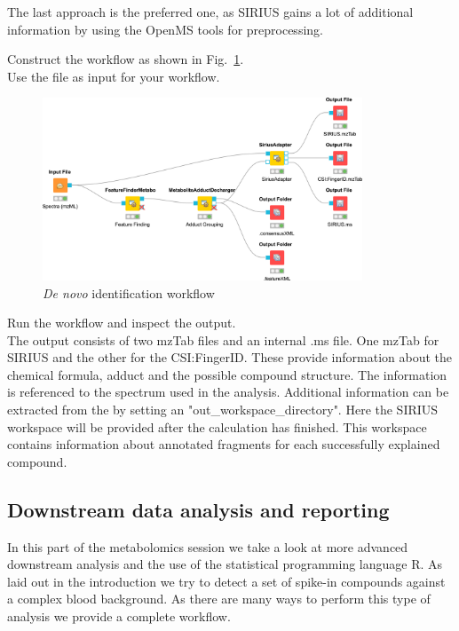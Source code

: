 The last approach is the preferred one, as SIRIUS gains a lot of additional information by using the OpenMS tools for preprocessing. 

\begin{task}
Construct the workflow as shown in Fig.~\ref{fig:denovoid}. \\
Use the file  as input for your workflow.  
\end{task}

\begin{figure}[htbp]
  \centering
  \includegraphics[width=0.85\textwidth]{graphics/metabo/denovoid.png}
  \caption{\protect\textit{De novo} identification workflow}
  \label{fig:denovoid}
\end{figure}

Run the workflow and inspect the output. \\

\noindent The output consists of two mzTab files and an internal .ms file. One mzTab for SIRIUS and the other for the CSI:FingerID. These provide information about the chemical formula, adduct and the possible compound structure. The information is referenced to the spectrum used in the analysis. Additional information can be extracted from the  by setting an "out\_workspace\_directory". Here the SIRIUS workspace will be provided after the calculation has finished. This workspace contains information about annotated fragments for each successfully explained compound.

\subsection{Downstream data analysis and reporting}
In this part of the metabolomics session we take a look at more advanced downstream analysis and the use of the statistical programming language R. As laid out in the introduction we try to detect a set of spike-in compounds against a complex blood background. As there are many ways to perform this type of analysis we provide a complete workflow.

